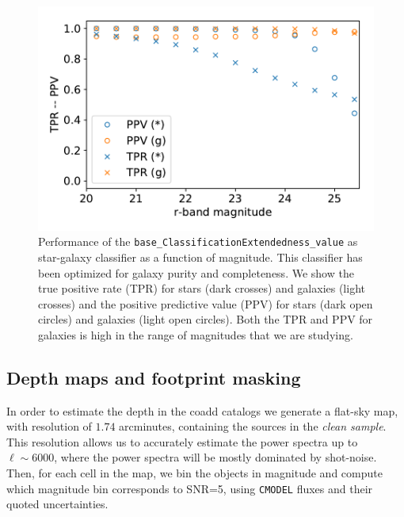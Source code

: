 \documentclass[\docopts]{\docclass}
\begin{document}
\begin{figure}
\centering
\includegraphics[width=0.9\columnwidth]{stellar_contamination_v2}
\caption{Performance of the \texttt{base\_ClassificationExtendedness\_value} as star-galaxy classifier as a function of magnitude. This classifier has been optimized for galaxy purity and completeness. We show the true positive rate (TPR) for stars (dark crosses) and galaxies (light crosses) and the positive predictive value (PPV) for stars (dark open circles) and galaxies (light open circles). Both the TPR and PPV for galaxies is high in the range of magnitudes that we are studying.}
\label{fig:star_galaxy_separation}
\end{figure}
\subsection{Depth maps and footprint masking}
\label{sec:masking}

In order to estimate the depth in the coadd catalogs we generate a flat-sky map, with resolution of $1.74$ arcminutes, containing the sources in the \textit{clean sample}. This resolution allows us to accurately estimate the power spectra up to $\ell \sim 6000$, where the power spectra will be mostly dominated by shot-noise. Then, for each cell in the map, we bin the objects in magnitude and compute which magnitude bin corresponds to SNR=5, using \texttt{CMODEL} fluxes and their quoted uncertainties.
\end{document}
